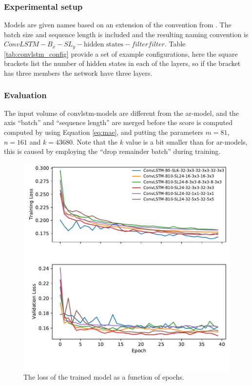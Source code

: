 \subsubsection{Experimental setup}
Models are given names based on an extension of the convention from .
The batch size and sequence length is included and 
the resulting naming convention is  $ConvLSTM-B_{x}-SL_{y}-\text{hidden states}-filter$\times$filter$. Table \ref{tab:convlstm_config} provide a set of example configurations, here the square brackets list the number of hidden states in each of the layers, so if the bracket has three members the network have three layers. 


\subsubsection{Evaluation}
The input volume of \acrshort{convlstm}-models are different from the \acrshort{ar}-model, and the axis ``batch'' and ``sequence length'' are merged before the score is computed computed by using Equation \eqref{eq:mae}, and putting the parameters $m = 81$, $n=161$ and $k=43680$. Note that the $k$ value is a bit smaller than for \acrshort{ar}-models, this is caused by employing the ``drop remainder batch'' during training. 

\begin{figure}
    \centering
    \includegraphics{python_figs/epoch_vs_loss.pdf}
    \caption{The loss of the trained model as a function of epochs.}
    \label{fig:convlstm_loss}
\end{figure}

